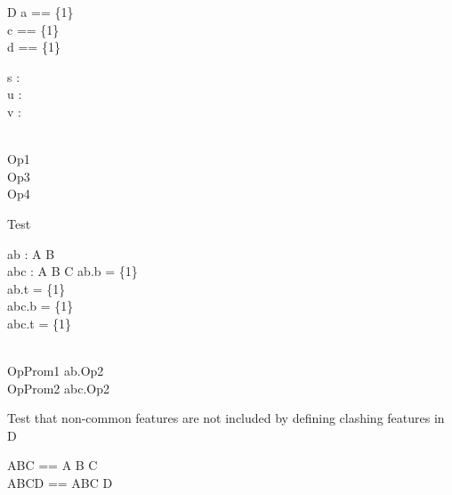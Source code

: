 \begin{class}{D}
  a == \{1\}\\
  c == \{1\}\\
  d == \{1\}\\
  \begin{state}
    s : \power\nat\\
    u : \power\nat\\
    v : \power\nat
  \end{state}\\
  Op1 \\
  Op3 \\
  Op4 
\end{class}

\begin{class}{Test}
  \begin{state}
    ab : A \classuni B\\
    abc : A \classuni B \classuni C
  \where
    ab.b = \{1\}\\
    ab.t = \{1\}\\
    abc.b = \{1\}\\
    abc.t = \{1\}\\
  \end{state}\\
  OpProm1 \sdef ab.Op2\\
  OpProm2 \sdef abc.Op2
\end{class}

Test that non-common features are not included by defining clashing
features in D
\begin{zed}
  ABC == A \classuni B \classuni C\\
  ABCD == ABC \classuni D
\end{zed}
